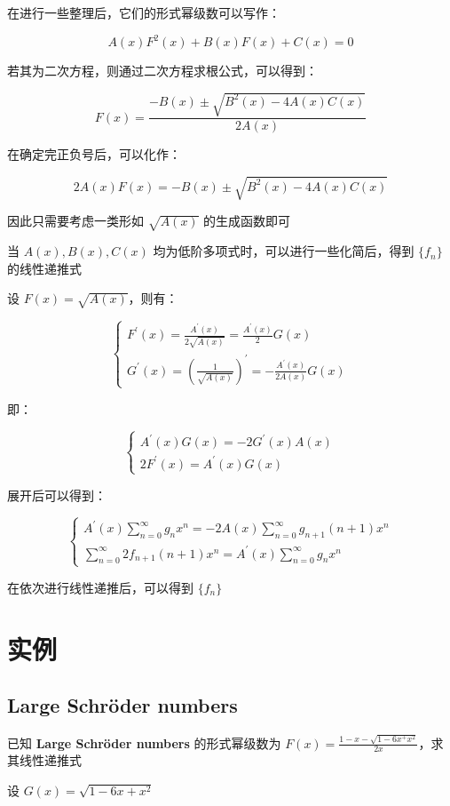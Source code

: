 \documentclass[UTF8]{article}
\begin{document}
在进行一些整理后，它们的形式幂级数可以写作：

$$
A(x)F^2(x)+B(x)F(x)+C(x)=0
$$

若其为二次方程，则通过二次方程求根公式，可以得到：

$$
F(x)=\frac{-B(x) \pm \sqrt{B^2(x)-4A(x)C(x)}}{2A(x)}
$$

在确定完正负号后，可以化作：

$$
2A(x)F(x)=-B(x) \pm \sqrt{B^2(x)-4A(x)C(x)}
$$

因此只需要考虑一类形如 $\sqrt{A(x)}$ 的生成函数即可

当 $A(x),B(x),C(x)$ 均为低阶多项式时，可以进行一些化简后，得到 $\{f_n\}$ 的线性递推式

设 $F(x)=\sqrt{A(x)}$，则有：

$$
\begin{cases}
    F ^\prime (x)=\frac{A ^\prime (x)}{2\sqrt{A(x)}}=\frac{A ^\prime (x)}{2} G(x) \\
    G ^\prime (x)=\left(\frac{1}{\sqrt{A(x)}}\right) ^\prime =-\frac{A ^\prime (x)}{2A(x)}G(x)
\end{cases}
$$

即：

$$
\begin{cases}
    A ^\prime (x)G(x)=-2G ^\prime (x)A(x) \\
    2F ^\prime (x)=A ^\prime (x)G(x)
\end{cases}
$$

展开后可以得到：

$$
\begin{cases}
    A ^\prime (x)\sum_{n=0}^{\infty}g_nx^n=-2A(x)\sum_{n=0}^{\infty}g_{n+1}(n+1)x^n \\
    \sum_{n=0}^{\infty}2f_{n+1}(n+1)x^n=A ^\prime (x)\sum_{n=0}^{\infty}g_nx^n
\end{cases}
$$

在依次进行线性递推后，可以得到 $\{f_n\}$

\section{实例}

\subsection{Large Schröder numbers}

已知 \textbf{Large Schröder numbers} 的形式幂级数为 $F(x)=\frac{1-x-\sqrt{1-6x^+x^2}}{2x}$，求其线性递推式

设 $G(x)=\sqrt{1-6x+x^2}$
\end{document}
